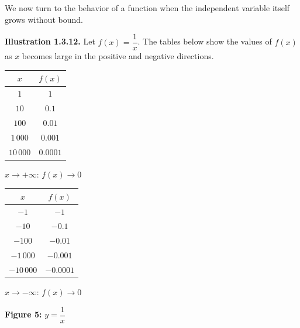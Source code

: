 We now turn to the behavior of a function when the independent variable itself grows without bound.

\medskip
\textbf{Illustration 1.3.12.}
Let \(f(x) = \dfrac{1}{x}\). The tables below show the values of \(f(x)\) as \(x\) becomes large in the positive and negative directions.

\begin{center}
\small
\begin{minipage}{0.45\textwidth}
\centering
\begin{tabular}{c|c}
\(x\)       & \(f(x)\) \\
\hline
\(1\)       & \(1\) \\
\(10\)      & \(0.1\) \\
\(100\)     & \(0.01\) \\
\(1\,000\)  & \(0.001\) \\
\(10\,000\) & \(0.0001\)
\end{tabular}

\smallskip
\(x \to +\infty\): \; \(f(x) \to 0\)
\end{minipage}
\hfill
\begin{minipage}{0.45\textwidth}
\centering
\begin{tabular}{c|c}
\(x\)        & \(f(x)\) \\
\hline
\(-1\)       & \(-1\) \\
\(-10\)      & \(-0.1\) \\
\(-100\)     & \(-0.01\) \\
\(-1\,000\)  & \(-0.001\) \\
\(-10\,000\) & \(-0.0001\)
\end{tabular}

\smallskip
\(x \to -\infty\): \; \(f(x) \to 0\)
\end{minipage}
\normalsize
\end{center}

\vspace{0.5em}
{\centering
{}

\nopagebreak\smallskip
\small\textbf{Figure 5:} \(y = \dfrac{1}{x}\)\par}
\vspace{0.5em}

